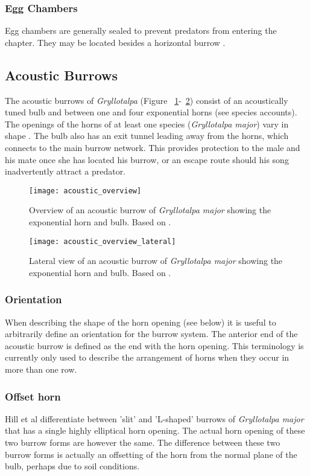 \documentclass{article}
\begin{document}
   \subsubsection{Egg Chambers}
   Egg chambers are generally sealed to prevent predators from entering the chapter. They may be located besides a horizontal burrow \cite{endo2007}.
   
   
   
   \subsection{Acoustic Burrows}
   The acoustic burrows of \textit{Gryllotalpa} (Figure ~\ref{fig:acoustic_overview}-~\ref{fig:acoustic_overview_lateral}) consist of an acoustically tuned bulb and between one and four exponential horns (see species accounts). The openings of the horns of at least one species (\textit{Gryllotalpa major}) vary in shape \cite{hill2006}. The bulb also has an exit tunnel leading away from the horns, which connects to the main burrow network. This provides protection to the male and his mate once she has located his burrow, or an escape route should his song inadvertently attract a predator.
   \begin{figure}[h]
   	\texttt{[image: acoustic\_overview]}
   	\caption{Overview of an acoustic burrow of \textit{Gryllotalpa major} showing the exponential horn and bulb. Based on \cite{walker1990}.}
   	\label{fig:acoustic_overview}
   \end{figure}
   \begin{figure}[h]
   	\texttt{[image: acoustic\_overview\_lateral]}
   	\caption{Lateral view of an acoustic burrow of \textit{Gryllotalpa major} showing the exponential horn and bulb. Based on \cite{walker1990}.}
   	\label{fig:acoustic_overview_lateral}
   \end{figure}
   
   \subsubsection{Orientation}
   When describing the shape of the horn opening (see below) it is useful to arbitrarily define an orientation for the burrow system. The anterior end of the acoustic burrow is defined as the end with the horn opening. This terminology is currently only used to describe the arrangement of horns when they occur in more than one row.
   
   \subsubsection{Offset horn}
   Hill et al \cite{hill2006} differentiate between 'slit' and 'L-shaped' burrows of \textit{Gryllotalpa major} that has a single highly elliptical horn opening. The actual horn opening of these two burrow forms are however the same. The difference between these two burrow forms is actually an offsetting of the horn from the normal plane of the bulb, perhaps due to soil conditions.
   
\end{document}
